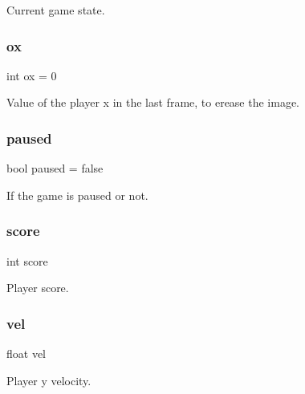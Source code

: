 Current game state. 

\mbox{\label{group__Game_gafef635ed3c73fc60d8faf6dd610c4298}} 
\subsubsection{\texorpdfstring{ox}{ox}}
{\footnotesize\ttfamily int ox = 0}



Value of the player x in the last frame, to erease the image. 

\mbox{\label{group__Game_ga1656129c4a4fd8809254194f08f0ac70}} 
\subsubsection{\texorpdfstring{paused}{paused}}
{\footnotesize\ttfamily bool paused = false}



If the game is paused or not. 

\mbox{\label{group__Game_gaef160b7437d94056f1dc59646cd5b87d}} 
\subsubsection{\texorpdfstring{score}{score}}
{\footnotesize\ttfamily int score}



Player score. 

\mbox{\label{group__Game_gafc29fb7fadd39a1bc2e3c52532248689}} 
\subsubsection{\texorpdfstring{vel}{vel}}
{\footnotesize\ttfamily float vel}



Player y velocity. 

